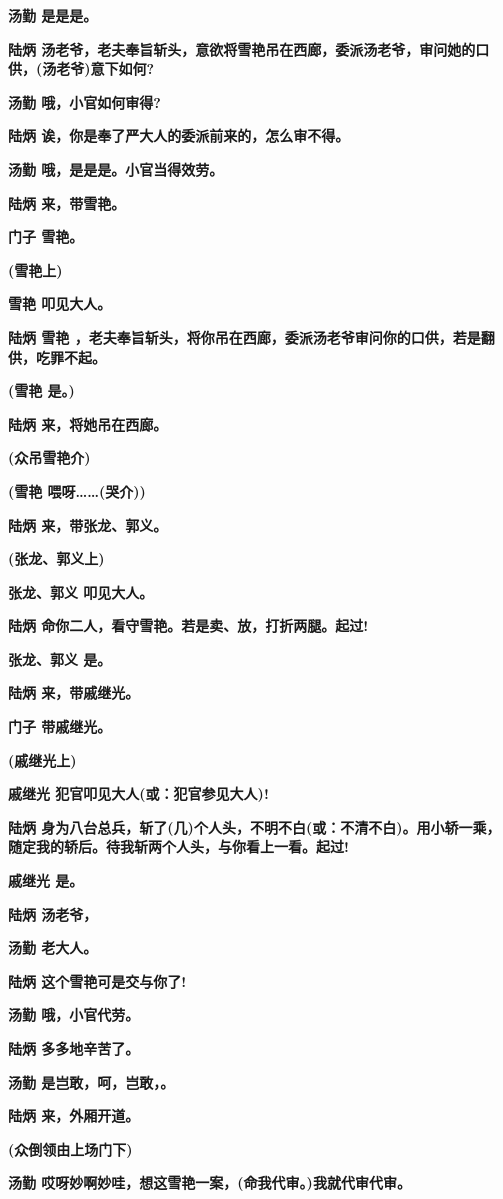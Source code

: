 \textbf{汤勤 是是是。}

\textbf{陆炳
汤老爷，老夫奉旨斩头，意欲将雪艳吊在西廊，委派汤老爷，审问她的口供，(汤老爷)意下如何?}

\textbf{汤勤 哦，小官如何审得?}

\textbf{陆炳 诶，你是奉了严大人的委派前来的，怎么审不得。}

\textbf{汤勤 哦，是是是。小官当得效劳。}

\textbf{陆炳 来，带雪艳。}

\textbf{门子 雪艳。}

\textbf{(雪艳上)}

\textbf{雪艳 叩见大人。}

\textbf{陆炳 雪艳
，老夫奉旨斩头，将你吊在西廊，委派汤老爷审问你的口供，若是翻供，吃罪不起。}

\textbf{(雪艳 是。)}

\textbf{陆炳 来，将她吊在西廊。}

\textbf{(众吊雪艳介)}

\textbf{(雪艳 喂呀\ldots{}\ldots{}(哭介))}

\textbf{陆炳 来，带张龙、郭义。}

\textbf{(张龙、郭义上)}

\textbf{张龙、郭义 叩见大人。}

\textbf{陆炳 命你二人，看守雪艳。若是卖、放，打折两腿。起过!}

\textbf{张龙、郭义 是。}

\textbf{陆炳 来，带戚继光。}

\textbf{门子 带戚继光。}

\textbf{(戚继光上)}

\textbf{戚继光 犯官叩见大人(或：犯官参见大人)!}

\textbf{陆炳
身为八台总兵，斩了(几)个人头，不明不白(或：不清不白)。用小轿一乘，随定我的轿后。待我斩两个人头，与你看上一看。起过!}

\textbf{戚继光 是。}

\textbf{陆炳 汤老爷，}

\textbf{汤勤 老大人。}

\textbf{陆炳 这个雪艳可是交与你了!}

\textbf{汤勤 哦，小官代劳。}

\textbf{陆炳 多多地辛苦了。}

\textbf{汤勤 是岂敢，呵，岂敢，。}

\textbf{陆炳 来，外厢开道。}

\textbf{(众倒领由上场门下)}

\textbf{汤勤 哎呀妙啊妙哇，想这雪艳一案，(命我代审。)我就代审代审。}


